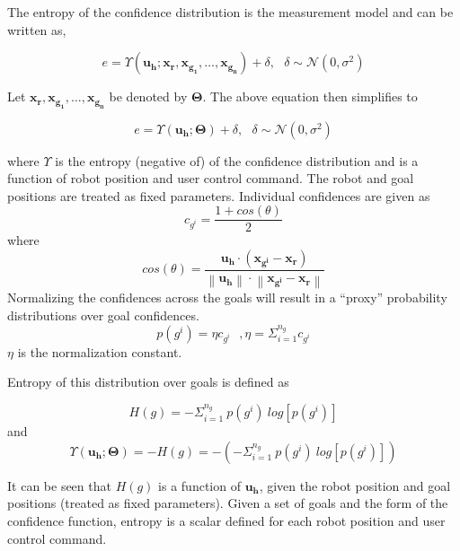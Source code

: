 \documentclass[]{article}
\newcommand{\norm}[1]{\left\lVert#1\right\rVert}
\begin{document}
The entropy of the confidence distribution is the measurement model and can be written as, 

\begin{equation*}
e = \Upsilon(\boldsymbol{u_h}; \boldsymbol{x_r}, \boldsymbol{x_{g_1}},\dots,\boldsymbol{x_{g_n}}) + \delta, ~~~ \delta \sim \mathcal{N}(0, \sigma^2)
\end{equation*}

Let $\boldsymbol{x_r}, \boldsymbol{x_{g_1}},\dots,\boldsymbol{x_{g_n}}$ be denoted by $\boldsymbol{\Theta}$. The above equation then simplifies to 

\begin{equation*}
e = \Upsilon(\boldsymbol{u_h}; \boldsymbol{\Theta}) + \delta, ~~~ \delta \sim \mathcal{N}(0, \sigma^2)
\end{equation*}


where $\Upsilon$ is the entropy (negative of) of the confidence distribution and is a function of robot position and user control command. The robot and goal positions are treated as fixed parameters. 
Individual confidences are given as 
\begin{equation*}
c_{g^i} = \frac{1 + cos(\theta)}{2}
\end{equation*}
where 
\begin{equation*}
cos(\theta) = \frac{\boldsymbol{u_h}\cdot(\boldsymbol{x_{g^i}} - \boldsymbol{x_r})}{\norm{\boldsymbol{u_h}}\cdot\norm{\boldsymbol{x_{g^i}} - \boldsymbol{x_r}}}
\end{equation*}
Normalizing the confidences across the goals will result in a ``proxy'' probability distributions over goal confidences. 
\begin{equation*}
p(g^i) = \eta c_{g^i} ~~~,  \eta = \Sigma_{i = 1}^{n_g} c_{g^i}
\end{equation*}
$\eta$ is the normalization constant. 

Entropy of this distribution over goals is defined as 

\begin{equation*}
H(g) = -\Sigma_{i = 1}^{n_g}~p(g^i)~log[p(g^i)]
\end{equation*}
and
\begin{equation*}
\Upsilon(\boldsymbol{u_h}; \boldsymbol{\Theta}) = -H(g) = -(-\Sigma_{i = 1}^{n_g}~p(g^i)~log[p(g^i)])
\end{equation*}

It can be seen that $H(g)$ is a function of $\boldsymbol{u_h}$, given the robot position and goal positions (treated as fixed parameters). Given a set of goals and the form of the confidence function, entropy is a scalar defined for each robot position and user control command. 
\end{document}
